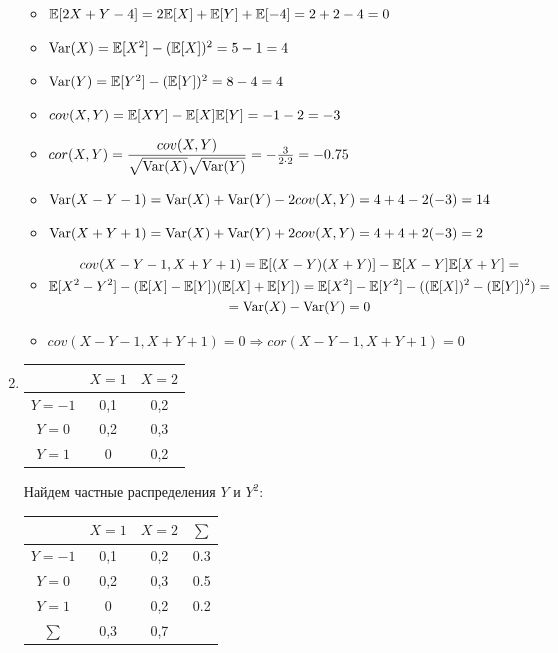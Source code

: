 \documentclass[12pt, a4paper]{article}\usepackage[]{graphicx}\usepackage[]{color}
\begin{document}
\begin{enumerate}
					\begin{itemize}
						\item  $\mathbb{E}[2X + Y - 4] = 2\mathbb{E}[X] + \mathbb{E}[Y] + \mathbb{E}[-4] = 2 + 2 - 4 = 0 $
						\item $\operatorname{Var}(X) = \mathbb{E}[X^2] - (\mathbb{E}[X])^2 = 5 - 1 = 4 $
						\item $\operatorname{Var}(Y) = \mathbb{E}[Y^2] - (\mathbb{E}[Y])^2 = 8 - 4 = 4 $
						\item $cov(X, Y) = \mathbb{E}[XY] - \mathbb{E}[X]\mathbb{E}[Y] = -1 - 2 = -3$
						\item $cor(X, Y) = \dfrac{cov(X, Y)}{\sqrt{\operatorname{Var}(X)}\sqrt{\operatorname{Var}(Y)}} = -\frac{3}{2\cdot 2} = -0.75$
						\item $\operatorname{Var}(X-Y-1) = \operatorname{Var}(X) + \operatorname{Var}(Y) - 2cov(X, Y) = 4+4 -2(-3) = 14$
						\item $\operatorname{Var}(X+Y+1) = \operatorname{Var}(X) + \operatorname{Var}(Y) + 2cov(X, Y) = 4+4+2(-3) =2 $
						\item \begin{multline}
						cov(X-Y-1, X+Y+1)=\mathbb{E}[(X-Y)(X+Y)]-\mathbb{E}[X-Y]\mathbb{E}[X+Y] = \\
						\mathbb{E}[X^2-Y^2] - (\mathbb{E}[X]-\mathbb{E}[Y])(\mathbb{E}[X] + \mathbb{E}[Y]) =
						\mathbb{E}[X^2] - \mathbb{E}[Y^2] - ((\mathbb{E}[X])^2 -(\mathbb{E}[Y])^2)=\\
						= \operatorname{Var}(X)-\operatorname{Var}(Y) = 0
						\end{multline}
						\item $cov(X-Y-1, X+Y+1)=0 \Rightarrow cor(X-Y-1, X+Y+1) = 0 $
					\end{itemize}

					\item
					\begin{center}
						\begin{tabular}{|c|c|c|}
							\hline
							& $X=1$ & $X=2$\\
							\hline
							$Y=-1$ & 0,1 & 0,2\\
							\hline
							$Y = 0$ & 0,2 & 0,3\\
							\hline
							$Y=1$ & 0 & 0,2 \\
							\hline
						\end{tabular}
					\end{center}
					Найдем частные распределения $Y$ и $Y^2$:


					\begin{center}
						\begin{tabular}{|c|c|c|c|}
							\hline
							& $X=1$ & $X=2$ & $\sum$\\
							\hline
							$Y=-1$ & 0,1 & 0,2 & 0.3\\
							\hline
							$Y = 0$ & 0,2 & 0,3 & 0.5\\
							\hline
							$Y=1$ & 0 & 0,2 & 0.2\\
							\hline
							$\sum$ & 0,3 & 0,7 &\\
							\hline
						\end{tabular}
					\end{center}


\end{enumerate}
\end{document}
